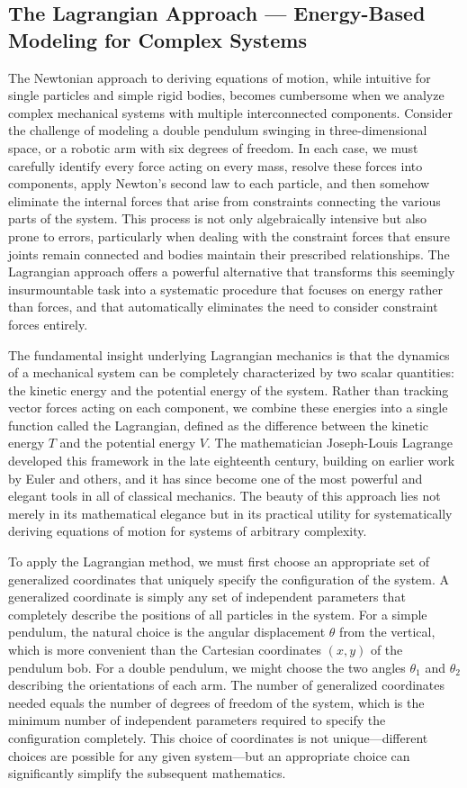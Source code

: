 \subsection{The Lagrangian Approach — Energy-Based Modeling for Complex Systems}

The Newtonian approach to deriving equations of motion, while intuitive for single particles and simple rigid bodies, becomes cumbersome when we analyze complex mechanical systems with multiple interconnected components. Consider the challenge of modeling a double pendulum swinging in three-dimensional space, or a robotic arm with six degrees of freedom. In each case, we must carefully identify every force acting on every mass, resolve these forces into components, apply Newton's second law to each particle, and then somehow eliminate the internal forces that arise from constraints connecting the various parts of the system. This process is not only algebraically intensive but also prone to errors, particularly when dealing with the constraint forces that ensure joints remain connected and bodies maintain their prescribed relationships. The Lagrangian approach offers a powerful alternative that transforms this seemingly insurmountable task into a systematic procedure that focuses on energy rather than forces, and that automatically eliminates the need to consider constraint forces entirely.

The fundamental insight underlying Lagrangian mechanics is that the dynamics of a mechanical system can be completely characterized by two scalar quantities: the kinetic energy and the potential energy of the system. Rather than tracking vector forces acting on each component, we combine these energies into a single function called the Lagrangian, defined as the difference between the kinetic energy $T$ and the potential energy $V$. The mathematician Joseph-Louis Lagrange developed this framework in the late eighteenth century, building on earlier work by Euler and others, and it has since become one of the most powerful and elegant tools in all of classical mechanics. The beauty of this approach lies not merely in its mathematical elegance but in its practical utility for systematically deriving equations of motion for systems of arbitrary complexity.

To apply the Lagrangian method, we must first choose an appropriate set of generalized coordinates that uniquely specify the configuration of the system. A generalized coordinate is simply any set of independent parameters that completely describe the positions of all particles in the system. For a simple pendulum, the natural choice is the angular displacement $\theta$ from the vertical, which is more convenient than the Cartesian coordinates $(x, y)$ of the pendulum bob. For a double pendulum, we might choose the two angles $\theta_1$ and $\theta_2$ describing the orientations of each arm. The number of generalized coordinates needed equals the number of degrees of freedom of the system, which is the minimum number of independent parameters required to specify the configuration completely. This choice of coordinates is not unique—different choices are possible for any given system—but an appropriate choice can significantly simplify the subsequent mathematics.

